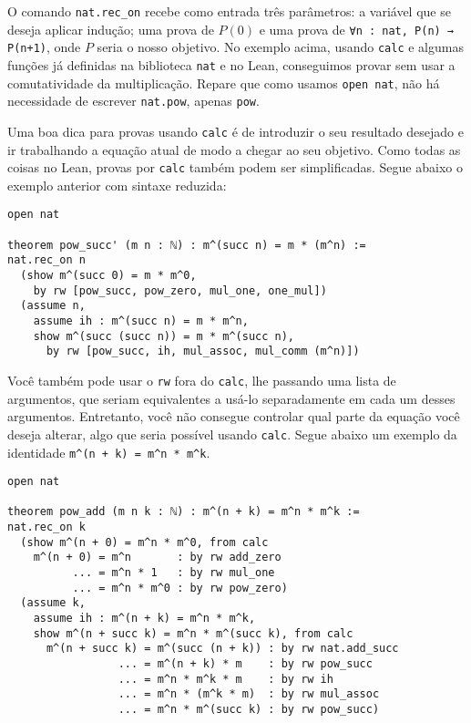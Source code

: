 O comando \lstinline{nat.rec_on} recebe como entrada três parâmetros: a variável que se deseja aplicar indução; uma prova de $P(0)$ e uma prova de \lstinline{∀n : nat, P(n) → P(n+1)}, onde $P$ seria o nosso objetivo. No exemplo acima, usando \lstinline{calc} e algumas funções já definidas na biblioteca \lstinline{nat} e no Lean, conseguimos provar sem usar a comutatividade da multiplicação. Repare que como usamos \lstinline{open nat}, não há necessidade de escrever \lstinline{nat.pow}, apenas \lstinline{pow}.

Uma boa dica para provas usando \lstinline{calc} é de introduzir o seu resultado desejado e ir trabalhando a equação atual de modo a chegar ao seu objetivo. Como todas as coisas no Lean, provas por \lstinline{calc} também podem ser simplificadas. Segue abaixo o exemplo anterior com sintaxe reduzida:

\begin{lstlisting}
open nat

theorem pow_succ' (m n : ℕ) : m^(succ n) = m * (m^n) :=
nat.rec_on n
  (show m^(succ 0) = m * m^0,
    by rw [pow_succ, pow_zero, mul_one, one_mul])
  (assume n,
    assume ih : m^(succ n) = m * m^n,
    show m^(succ (succ n)) = m * m^(succ n),
      by rw [pow_succ, ih, mul_assoc, mul_comm (m^n)])
\end{lstlisting}

Você também pode usar o \lstinline{rw} fora do \lstinline{calc}, lhe passando uma lista de argumentos, que seriam equivalentes a usá-lo separadamente em cada um desses argumentos.
Entretanto, você não consegue controlar qual parte da equação você deseja alterar, algo que seria possível usando \lstinline{calc}. Segue abaixo um exemplo da identidade \lstinline{m^(n + k) = m^n * m^k}.

\begin{lstlisting}
open nat

theorem pow_add (m n k : ℕ) : m^(n + k) = m^n * m^k :=
nat.rec_on k
  (show m^(n + 0) = m^n * m^0, from calc
    m^(n + 0) = m^n       : by rw add_zero
          ... = m^n * 1   : by rw mul_one
          ... = m^n * m^0 : by rw pow_zero)
  (assume k,
    assume ih : m^(n + k) = m^n * m^k,
    show m^(n + succ k) = m^n * m^(succ k), from calc
      m^(n + succ k) = m^(succ (n + k)) : by rw nat.add_succ
                 ... = m^(n + k) * m    : by rw pow_succ
                 ... = m^n * m^k * m    : by rw ih
                 ... = m^n * (m^k * m)  : by rw mul_assoc
                 ... = m^n * m^(succ k) : by rw pow_succ)
\end{lstlisting}

